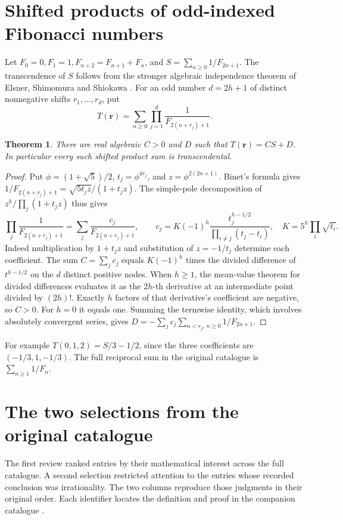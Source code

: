 \documentclass[11pt,a4paper]{article}
\newtheorem{theorem}{Theorem}[section]
\begin{document}
\section{Shifted products of odd-indexed Fibonacci numbers}
Let \(F_0=0,F_1=1,F_{n+2}=F_{n+1}+F_n\), and
\(S=\sum_{n\ge0}1/F_{2n+1}\). The transcendence of \(S\) follows from
the stronger algebraic independence theorem of Elsner, Shimomura and
Shiokawa \cite{ess-odd}. For an odd number \(d=2h+1\) of distinct
nonnegative shifts \(r_1,\ldots,r_d\), put
\[
 T(\boldsymbol r)=\sum_{n\ge0}\prod_{j=1}^d \frac{1}{F_{2(n+r_j)+1}} .
\]
\begin{theorem}
There are real algebraic \(C>0\) and \(D\) such that
\(T(\boldsymbol r)=CS+D\). In particular every such shifted product
sum is transcendental.
\end{theorem}
\begin{proof}
Put \(\phi=(1+\sqrt5)/2\), \(t_j=\phi^{4r_j}\), and
\(z=\phi^{2(2n+1)}\). Binet's formula gives
\(1/F_{2(n+r_j)+1}=\sqrt{5t_jz}/(1+t_jz)\).
The simple-pole decomposition of
\(z^h/\prod_j(1+t_jz)\) thus gives
\[
 \prod_j\frac{1}{F_{2(n+r_j)+1}}
  =\sum_j \frac{c_j}{F_{2(n+r_j)+1}},
 \qquad
 c_j=K(-1)^h\frac{t_j^{h-1/2}}{\prod_{i\ne j}(t_j-t_i)},
 \quad K=5^h\prod_i\sqrt{t_i}.
\]
Indeed multiplication by \(1+t_jz\) and substitution of \(z=-1/t_j\)
determine each coefficient. The sum \(C=\sum_j c_j\) equals \(K(-1)^h\)
times the divided difference of \(t^{h-1/2}\) on the \(d\) distinct
positive nodes. When \(h\ge1\), the mean-value theorem for divided
differences evaluates it as the \(2h\)-th derivative at an intermediate
point divided by \((2h)!\). Exactly \(h\) factors of that derivative's
coefficient are negative, so \(C>0\). For \(h=0\) it equals one.
Summing the termwise identity, which involves absolutely convergent
series, gives \(D=-\sum_j c_j\sum_{n<r_j,\,n\ge0}1/F_{2n+1}\).
\end{proof}
For example \(T(0,1,2)=S/3-1/2\), since the three coefficients are
\((-1/3,1,-1/3)\). The full reciprocal sum in the original catalogue is
\(\sum_{n\ge1}1/F_n\).


\appendix
\section{The two selections from the original catalogue}\label{sec:rankings}
The first review ranked entries by their mathematical interest across the
full catalogue. A second selection restricted attention to the entries
whose recorded conclusion was irrationality. The two columns reproduce
those judgments in their original order. Each identifier locates the
definition and proof in the companion catalogue \cite{catalogue}.
\end{document}

